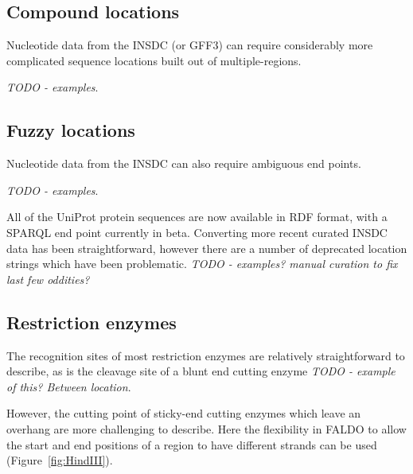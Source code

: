 \subsection*{Compound locations}
Nucleotide data from the INSDC (or GFF3) can require considerably
more complicated sequence locations built out of multiple-regions.

\textit{TODO - examples}.

\subsection*{Fuzzy locations}
Nucleotide data from the INSDC can also require ambiguous end points.

\textit{TODO - examples}.

All of the UniProt protein sequences are now available in RDF format,
with a SPARQL end point currently in beta. Converting more recent
curated INSDC data has been straightforward, however there are a
number of deprecated location strings which have been problematic.
\textit{TODO - examples? manual curation to fix last few oddities?}

\subsection*{Restriction enzymes}

The recognition sites of most restriction enzymes are relatively
straightforward to describe, as is the cleavage site of a blunt
end cutting enzyme \textit{TODO - example of this? Between location}.

However, the cutting point of sticky-end cutting enzymes which
leave an overhang are more challenging to describe. Here the
flexibility in FALDO to allow the start and end positions of a region
to have different strands can be used (Figure~\ref{fig:HindIII}).

